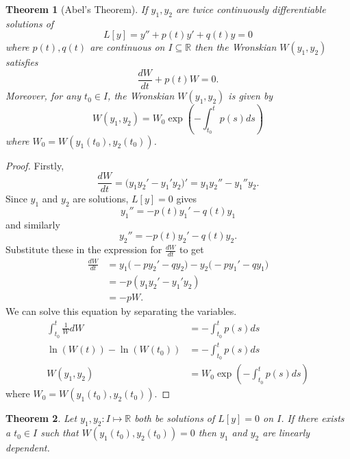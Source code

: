 \documentclass{article}
\theoremstyle{plain}
\newtheorem{thm}{Theorem}[section]
\theoremstyle{definition}
\numberwithin{equation}{section}
\begin{document}
\begin{thm}[Abel's Theorem]
    If $y_1,y_2$ are twice continuously differentiable solutions of
    \[
    L[y] = y'' + p(t)y' + q(t)y = 0
    \]
    where $p(t),q(t)$ are continuous on $I \subseteq \mathbb{R}$ then the Wronskian $W(y_1, y_2)$ satisfies
    \begin{equation}
    \frac{dW}{dt} + p(t)W = 0.
    \label{eq:WronskianODE}
    \end{equation}
    Moreover, for any $t_0 \in I$, the Wronskian $W(y_1, y_2)$ is given by
    \begin{equation}
    \tag{Abel's Formula}
    W(y_1, y_2) = W_0 \exp\left(-\int_{t_0}^{t} p(s) ds \right) 
    \label{eq:AbelsFormula}
    \end{equation}
    where $W_0 = W(y_1(t_0), y_2(t_0))$.
\end{thm}

\begin{proof}
    Firstly,
    \[
    \frac{dW}{dt} = \Big( y_1y_2' - y_1'y_2 \Big)' = y_1y_2'' - y_1''y_2.
    \]
    Since $y_1$ and $y_2$ are solutions, $L[y] = 0$ gives
    \[
        y_1'' = -p(t)y_1' - q(t)y_1
    \]
    and similarly
    \[
        y_2'' = -p(t)y_2' - q(t)y_2.
    \]
    Substitute these in the expression for $\frac{dW}{dt}$ to get
    \begin{align*}
        \frac{dW}{dt} &= y_1\Big( -py_2' - qy_2 \Big) - y_2\Big( -py_1' - qy_1 \Big) \\
        &= -p(y_1y_2' - y_1'y_2) \\
        &= - pW. 
    \end{align*}
    We can solve this equation by separating the variables.
    \begin{align*}
        \int_{t_0}^{t} \frac{1}{W} dW &= - \int_{t_0}^t p(s) ds \\
        \ln\left(W(t)\right) - \ln\left(W(t_0)\right) &= - \int_{t_0}^t p(s) ds \\
        W(y_1, y_2) &= W_0\exp\left( - \int_{t_0}^t p(s) ds \right)
    \end{align*}
    where $W_0 = W(y_1(t_0), y_2(t_0))$.
\end{proof}

\begin{thm}
    Let $y_1,y_2: I \mapsto\mathbb{R}$ both be solutions of $L[y]=0$ on $I$. If there exists a $t_0\in I$ such that $W(y_1(t_0),y_2(t_0)) = 0$ then $y_1$ and $y_2$ are linearly dependent.
\end{thm}
\end{document}
